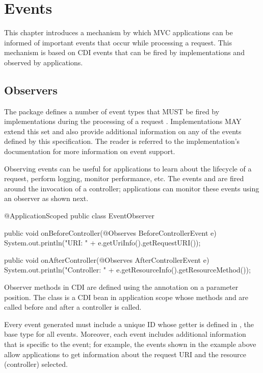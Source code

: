 \chapter{Events}
\label{events}

This chapter introduces a mechanism by which MVC applications can be informed 
of important events that occur while processing a request. This mechanism 
is based on CDI events that can be fired by implementations and observed by 
applications.

\section{Observers}
\label{observers}

The package  defines a number of event types that MUST be 
fired by implementations during the processing of a request . 
Implementations MAY
extend this set and also provide additional information on any of the events defined
by this specification. The reader is referred to the implementation's documentation
for more information on event support.

Observing events can be useful for applications to learn about the lifecycle of a 
request, perform logging, monitor performance, etc. The events
 and  are fired around
the invocation of a controller; applications can monitor these events using an 
observer as shown next.

\begin{listing}{1}
@ApplicationScoped
public class EventObserver {

    public void onBeforeController(@Observes BeforeControllerEvent e) {
        System.out.println("URI: " + e.getUriInfo().getRequestURI());
    }
    
    public void onAfterController(@Observes AfterControllerEvent e) {
        System.out.println("Controller: " + 
            e.getResourceInfo().getResourceMethod());
    }
}
\end{listing}

Observer methods in CDI are defined using the  annotation on 
a parameter position.
The class  is a CDI bean in application scope whose methods
 and  are called 
before and after a controller is called. 

Every event generated must include a
unique ID whose getter is defined in , the base type for all
events. Moreover, each event includes additional information that is specific to
the event; for example, the events shown in the example above allow applications
to get information about the request URI and the resource (controller) selected.

